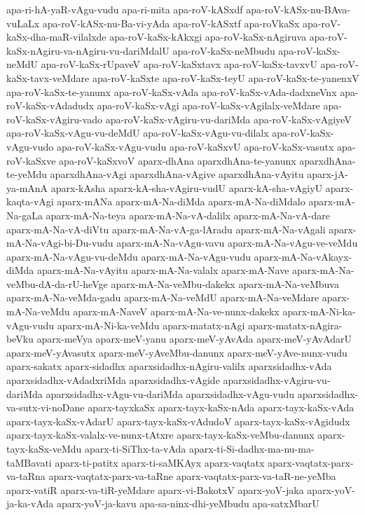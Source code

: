 {apa-ri-hA-yaR-vAgu-vudu
apa-ri-mita
apa-roV-kASxdf
apa-roV-kASx-nu-BAva-vuLaLx
apa-roV-kASx-nu-Ba-vi-yAda
apa-roV-kASxtf
apa-roVkaSx
apa-roV-kaSx-dha-maR-vilalxde
apa-roV-kaSx-kAkxgi
apa-roV-kaSx-nAgiruva
apa-roV-kaSx-nAgiru-va-nAgiru-vu-dariMdalU
apa-roV-kaSx-neMbudu
apa-roV-kaSx-neMdU
apa-roV-kaSx-rUpaveV
apa-roV-kaSxtavx
apa-roV-kaSx-tavxvU
apa-roV-kaSx-tavx-veMdare
apa-roV-kaSxte
apa-roV-kaSx-teyU
apa-roV-kaSx-te-yanenxV
apa-roV-kaSx-te-yanunx
apa-roV-kaSx-vAda
apa-roV-kaSx-vAda-dadxneVnx
apa-roV-kaSx-vAdadudx
apa-roV-kaSx-vAgi
apa-roV-kaSx-vAgilalx-veMdare
apa-roV-kaSx-vAgiru-vado
apa-roV-kaSx-vAgiru-vu-dariMda
apa-roV-kaSx-vAgiyeV
apa-roV-kaSx-vAgu-vu-deMdU
apa-roV-kaSx-vAgu-vu-dilalx
apa-roV-kaSx-vAgu-vudo
apa-roV-kaSx-vAgu-vudu
apa-roV-kaSxvU
apa-roV-kaSx-vasutx
apa-roV-kaSxve
apa-roV-kaSxvoV
aparx-dhAna
aparxdhAna-te-yanunx
aparxdhAna-te-yeMdu
aparxdhAna-vAgi
aparxdhAna-vAgive
aparxdhAna-vAyitu
aparx-jA-ya-mAnA
aparx-kAsha
aparx-kA-sha-vAgiru-vudU
aparx-kA-sha-vAgiyU
aparx-kaqta-vAgi
aparx-mANa
aparx-mA-Na-diMda
aparx-mA-Na-diMdalo
aparx-mA-Na-gaLa
aparx-mA-Na-teya
aparx-mA-Na-vA-dalilx
aparx-mA-Na-vA-dare
aparx-mA-Na-vA-diVtu
aparx-mA-Na-vA-ga-lAradu
aparx-mA-Na-vAgali
aparx-mA-Na-vAgi-bi-Du-vudu
aparx-mA-Na-vAgu-vavu
aparx-mA-Na-vAgu-ve-veMdu
aparx-mA-Na-vAgu-vu-deMdu
aparx-mA-Na-vAgu-vudu
aparx-mA-Na-vAkayx-diMda
aparx-mA-Na-vAyitu
aparx-mA-Na-valalx
aparx-mA-Nave
aparx-mA-Na-veMbu-dA-da-rU-heVge
aparx-mA-Na-veMbu-dakekx
aparx-mA-Na-veMbuva
aparx-mA-Na-veMda-gadu
aparx-mA-Na-veMdU
aparx-mA-Na-veMdare
aparx-mA-Na-veMdu
aparx-mA-NaveV
aparx-mA-Na-ve-nunx-dakekx
aparx-mA-Ni-ka-vAgu-vudu
aparx-mA-Ni-ka-veMdu
aparx-matatx-nAgi
aparx-matatx-nAgira-beVku
aparx-meVya
aparx-meV-yanu
aparx-meV-yAvAda
aparx-meV-yAvAdarU
aparx-meV-yAvasutx
aparx-meV-yAveMbu-danunx
aparx-meV-yAve-nunx-vudu
aparx-sakatx
aparx-sidadhx
aparxsidadhx-nAgiru-valilx
aparxsidadhx-vAda
aparxsidadhx-vAdadxriMda
aparxsidadhx-vAgide
aparxsidadhx-vAgiru-vu-dariMda
aparxsidadhx-vAgu-vu-dariMda
aparxsidadhx-vAgu-vudu
aparxsidadhx-va-sutx-vi-noDane
aparx-tayxkaSx
aparx-tayx-kaSx-nAda
aparx-tayx-kaSx-vAda
aparx-tayx-kaSx-vAdarU
aparx-tayx-kaSx-vAdudoV
aparx-tayx-kaSx-vAgidudx
aparx-tayx-kaSx-valalx-ve-nunx-tAtxre
aparx-tayx-kaSx-veMbu-danunx
aparx-tayx-kaSx-veMdu
aparx-ti-SiThx-ta-vAda
aparx-ti-Si-dadhx-ma-nu-ma-taMBavati
aparx-ti-patitx
aparx-ti-saMKAyx
aparx-vaqtatx
aparx-vaqtatx-parx-va-taRna
aparx-vaqtatx-parx-va-taRne
aparx-vaqtatx-parx-va-taR-ne-yeMba
aparx-vatiR
aparx-va-tiR-yeMdare
aparx-vi-BakotxV
aparx-yoV-jaka
aparx-yoV-ja-ka-vAda
aparx-yoV-ja-kavu
apa-sa-ninx-dhi-yeMbudu
apa-satxMbarU
}
